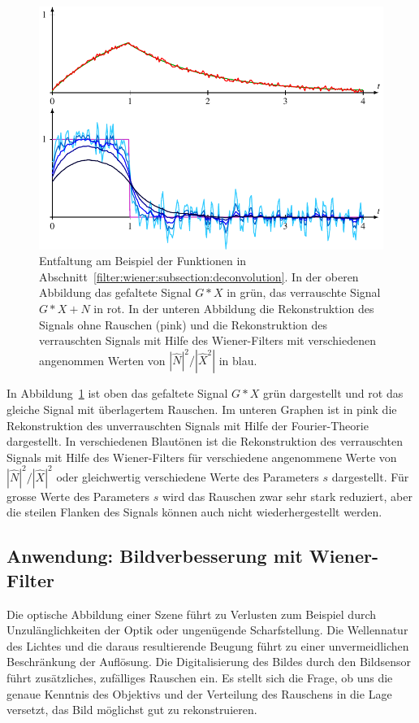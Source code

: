 \begin{figure}
\centering
\includegraphics{8-filter/images/filterung.pdf}
\caption{Entfaltung am Beispiel der Funktionen in
Abschnitt~\ref{filter:wiener:subsection:deconvolution}.
In der oberen Abbildung das gefaltete Signal $G*X$ in grün,
das verrauschte Signal $G*X+N$ in rot.
In der unteren Abbildung die Rekonstruktion des Signals ohne
Rauschen (pink) und die Rekonstruktion des verrauschten Signals
mit Hilfe des Wiener-Filters mit verschiedenen angenommen
Werten von $|\hat{N}|^2/|\hat{X}^2|$ in blau.
\label{filter:wiener:rekonstruktion}}
\end{figure}
In Abbildung~\ref{filter:wiener:rekonstruktion} ist oben das 
gefaltete Signal $G*X$ grün dargestellt und rot das gleiche Signal
mit überlagertem Rauschen.
Im unteren Graphen ist in pink die Rekonstruktion des unverrauschten
Signals mit Hilfe der Fourier-Theorie dargestellt.
In verschiedenen Blautönen ist die Rekonstruktion des verrauschten
Signals mit Hilfe des Wiener-Filters für verschiedene angenommene
Werte von $|\hat{N}|^2/|\hat{X}|^2$ oder gleichwertig verschiedene
Werte des Parameters $s$ dargestellt.
Für grosse Werte des Parameters $s$ wird das Rauschen zwar sehr stark
reduziert, aber die steilen Flanken des Signals können auch nicht
wiederhergestellt werden.

\subsection{Anwendung: Bildverbesserung mit Wiener-Filter
\label{filter:wiener:subsection:bildverbesserung}}
Die optische Abbildung einer Szene führt zu Verlusten zum Beispiel
durch Unzulänglichkeiten der Optik oder ungenügende Scharfstellung.
Die Wellennatur des Lichtes und die daraus resultierende
Beugung führt zu einer unvermeidlichen Beschränkung der Auflösung.
Die Digitalisierung des Bildes durch den Bildsensor führt zusätzliches,
zufälliges Rauschen ein.
Es stellt sich die Frage, ob uns die genaue Kenntnis des Objektivs und der
Verteilung des Rauschens in die Lage versetzt, das Bild möglichst
gut zu rekonstruieren.

